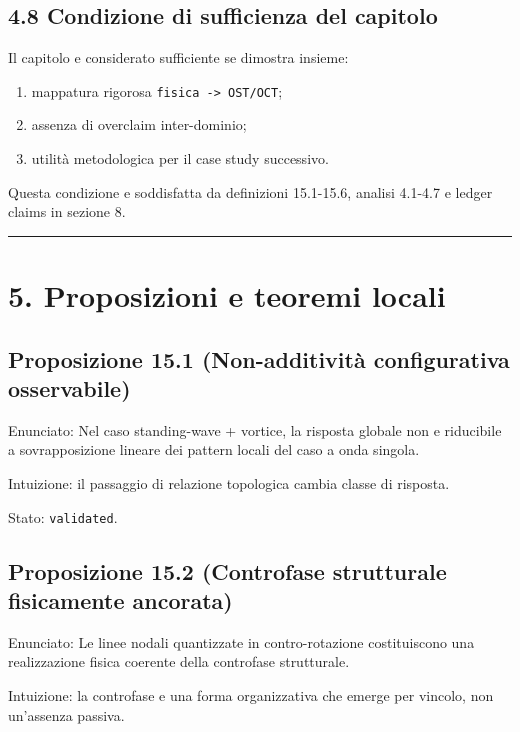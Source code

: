 \subsection{4.8 Condizione di sufficienza del capitolo}

Il capitolo e considerato sufficiente se dimostra insieme:

\begin{enumerate}
\def\labelenumi{\arabic{enumi}.}
\tightlist
\item
  mappatura rigorosa \texttt{fisica\ -\textgreater{}\ OST/OCT};
\item
  assenza di overclaim inter-dominio;
\item
  utilità metodologica per il case study successivo.
\end{enumerate}

Questa condizione e soddisfatta da definizioni 15.1-15.6, analisi 4.1-4.7 e ledger claims in sezione 8.

\begin{center}\rule{0.5\linewidth}{0.5pt}\end{center}

\section{5. Proposizioni e teoremi locali}

\subsection{Proposizione 15.1 (Non-additività configurativa osservabile)}

Enunciato:
Nel caso standing-wave + vortice, la risposta globale non e riducibile a sovrapposizione lineare dei pattern locali del caso a onda singola.

Intuizione:
il passaggio di relazione topologica cambia classe di risposta.

Stato: \texttt{validated}.

\subsection{Proposizione 15.2 (Controfase strutturale fisicamente ancorata)}

Enunciato:
Le linee nodali quantizzate in contro-rotazione costituiscono una realizzazione fisica coerente della controfase strutturale.

Intuizione:
la controfase e una forma organizzativa che emerge per vincolo, non un'assenza passiva.

